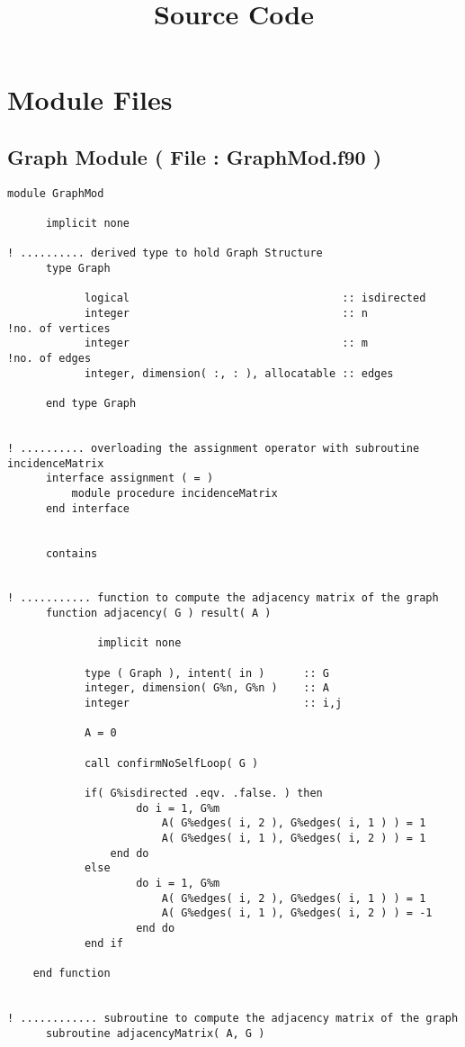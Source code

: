 \documentclass[10pt,a4paper,margin = 1.25cm]{article}
\title{Source Code}
\begin{document}
\maketitle
\section*{Module Files}
\subsection*{Graph Module ( File : GraphMod.f90 )}
\begin{lstlisting}
module GraphMod
 
	  implicit none
  
! .......... derived type to hold Graph Structure
	  type Graph

		    logical                                 :: isdirected  
		    integer                                 :: n                   !no. of vertices
		    integer                                 :: m                   !no. of edges
		    integer, dimension( :, : ), allocatable :: edges 

	  end type Graph


! .......... overloading the assignment operator with subroutine incidenceMatrix  
	  interface assignment ( = )
	      module procedure incidenceMatrix
	  end interface   

  
	  contains

  
! ........... function to compute the adjacency matrix of the graph
	  function adjacency( G ) result( A )

			  implicit none

	  		type ( Graph ), intent( in )      :: G   
	  		integer, dimension( G%n, G%n )    :: A 
	  		integer                           :: i,j
  
	  		A = 0  
	  		
	  		call confirmNoSelfLoop( G )
	   		
	  		if( G%isdirected .eqv. .false. ) then
				    do i = 1, G%m
    			  		A( G%edges( i, 2 ), G%edges( i, 1 ) ) = 1
    			  		A( G%edges( i, 1 ), G%edges( i, 2 ) ) = 1
    		    end do
  			else
    				do i = 1, G%m
      					A( G%edges( i, 2 ), G%edges( i, 1 ) ) = 1
		  			    A( G%edges( i, 1 ), G%edges( i, 2 ) ) = -1
    				end do
  			end if
  
  	end function


! ............ subroutine to compute the adjacency matrix of the graph
	  subroutine adjacencyMatrix( A, G )
 		

\end{lstlisting}
\end{document}
